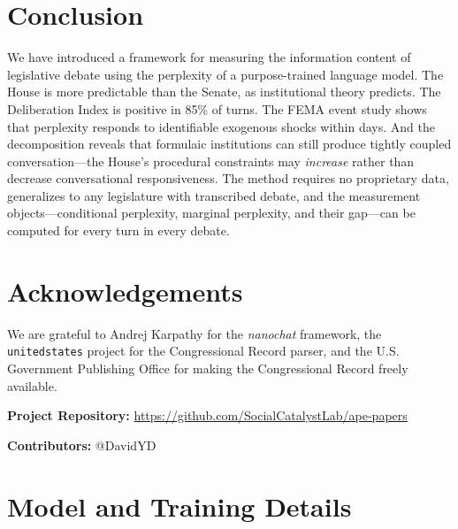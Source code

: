 \documentclass[12pt]{article}
\begin{document}
\section{Conclusion}

We have introduced a framework for measuring the information content of legislative debate using the perplexity of a purpose-trained language model. The House is more predictable than the Senate, as institutional theory predicts. The Deliberation Index is positive in 85\% of turns. The FEMA event study shows that perplexity responds to identifiable exogenous shocks within days. And the decomposition reveals that formulaic institutions can still produce tightly coupled conversation---the House's procedural constraints may \textit{increase} rather than decrease conversational responsiveness. The method requires no proprietary data, generalizes to any legislature with transcribed debate, and the measurement objects---conditional perplexity, marginal perplexity, and their gap---can be computed for every turn in every debate.


\section*{Acknowledgements}

We are grateful to Andrej Karpathy for the \textit{nanochat} framework, the \texttt{unitedstates} project for the Congressional Record parser, and the U.S. Government Publishing Office for making the Congressional Record freely available.

\noindent\textbf{Project Repository:} \url{https://github.com/SocialCatalystLab/ape-papers}

\noindent\textbf{Contributors:} @DavidYD

\label{apep_main_text_end}
\newpage


\newpage
\appendix

\section{Model and Training Details}
\label{app:training}
\end{document}
